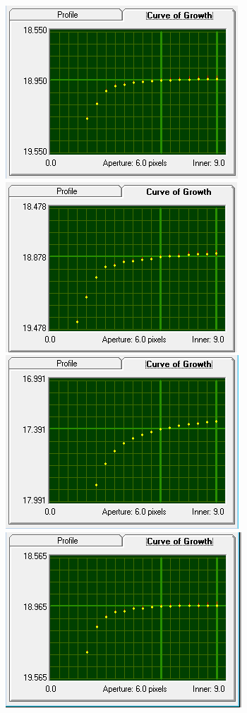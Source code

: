 \documentclass[12pt]{article}
\begin{document}
\begin{figure}[H]
\centering
\begin{multicols}{2}
\includegraphics[scale=1.0]{Images/AsImages/SI/Sr1-Growth.PNG} \\ [0.2cm]
\includegraphics[scale=1.0]{Images/AsImages/SI/Sr3-Growth.PNG}
\includegraphics[scale=1.0]{Images/AsImages/SI/Sr2-Growth.PNG} \\ [0.2cm]
\includegraphics[scale=1.0]{Images/AsImages/SI/Sr4-Growth.PNG}

\end{multicols}
\end{figure}
\end{document}
